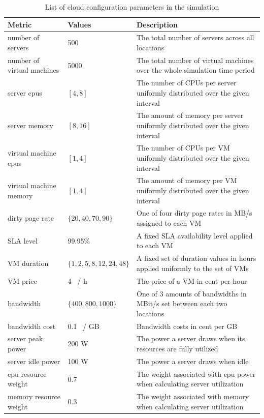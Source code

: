 \begin{table}[htbp]
\centering
\begin{tabularx}{\textwidth}{l|l|X}
	Metric & Values & Description \\
\hline
	number of servers & 500 & The total number of servers across all locations \\
	number of virtual machines & 5000 & The total number of virtual machines over the whole simulation time period \\
	server cpus & $[4,8]$ & The number of CPUs per server uniformly distributed over the given interval \\
	server memory & $[8,16]$ & The amount of memory per server uniformly distributed over the given interval \\
	virtual machine cpus & $[1,4]$ & The number of CPUs per VM uniformly distributed over the given interval \\
	virtual machine memory & $[1,4]$ & The amount of memory per VM uniformly distributed over the given interval \\
	dirty page rate & $\{20,40,70,90\}$ & One of four dirty page rates in MB/s assigned to each VM \\
	SLA level & 99.95\% & A fixed SLA availability level applied to each VM \\
	VM duration & $\{1,2,5,8,12,24,48\}$ & A fixed set of duration values in hours applied uniformly to the set of VMs \\
	VM price & 4 \cent \ / h & The price of a VM in cent per hour \\
	bandwidth & $\{400,800,1000\}$ & One of 3 amounts of bandwidths in MBit/s set between each two locations \\
	bandwidth cost & 0.1 \cent \ / GB & Bandwidth costs in cent per GB \\
	server peak power & 200 W & The power a server draws when its resources are fully utilized \\
	server idle power & 100 W & The power a server draws when idle \\
	cpu resource weight & 0.7 & The weight associated with cpu power when calculating server utilization \\
	memory resource weight & 0.3 & The weight associated with memory when calculating server utilization \\
\end{tabularx}
\caption{List of cloud configuration parameters in the simulation}
\label{tab:list_of_cloud_parameters}
\end{table}

